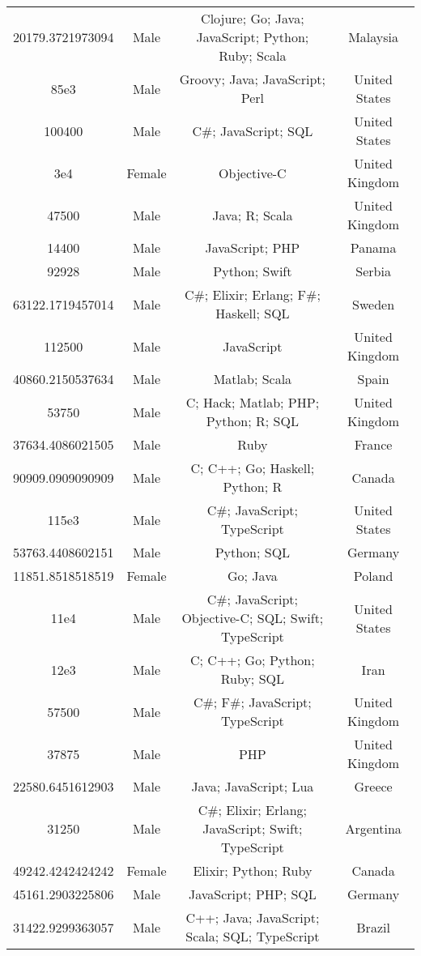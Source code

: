 \begin{center}
\begin{tabular}{ |c|c|c|c| }
20179.3721973094  &  Male  &  Clojure; Go; Java; JavaScript; Python; Ruby; Scala  &  Malaysia  \\ 
85e3  &  Male  &  Groovy; Java; JavaScript; Perl  &  United States  \\ 
100400  &  Male  &  C\#; JavaScript; SQL  &  United States  \\ 
3e4  &  Female  &  Objective-C  &  United Kingdom  \\ 
47500  &  Male  &  Java; R; Scala  &  United Kingdom  \\ 
14400  &  Male  &  JavaScript; PHP  &  Panama  \\ 
92928  &  Male  &  Python; Swift  &  Serbia  \\ 
63122.1719457014  &  Male  &  C\#; Elixir; Erlang; F\#; Haskell; SQL  &  Sweden  \\ 
112500  &  Male  &  JavaScript  &  United Kingdom  \\ 
40860.2150537634  &  Male  &  Matlab; Scala  &  Spain  \\ 
53750  &  Male  &  C; Hack; Matlab; PHP; Python; R; SQL  &  United Kingdom  \\ 
37634.4086021505  &  Male  &  Ruby  &  France  \\ 
90909.0909090909  &  Male  &  C; C++; Go; Haskell; Python; R  &  Canada  \\ 
115e3  &  Male  &  C\#; JavaScript; TypeScript  &  United States  \\ 
53763.4408602151  &  Male  &  Python; SQL  &  Germany  \\ 
11851.8518518519  &  Female  &  Go; Java  &  Poland  \\ 
11e4  &  Male  &  C\#; JavaScript; Objective-C; SQL; Swift; TypeScript  &  United States  \\ 
12e3  &  Male  &  C; C++; Go; Python; Ruby; SQL  &  Iran  \\ 
57500  &  Male  &  C\#; F\#; JavaScript; TypeScript  &  United Kingdom  \\ 
37875  &  Male  &  PHP  &  United Kingdom  \\ 
22580.6451612903  &  Male  &  Java; JavaScript; Lua  &  Greece  \\ 
31250  &  Male  &  C\#; Elixir; Erlang; JavaScript; Swift; TypeScript  &  Argentina  \\ 
49242.4242424242  &  Female  &  Elixir; Python; Ruby  &  Canada  \\ 
45161.2903225806  &  Male  &  JavaScript; PHP; SQL  &  Germany  \\ 
31422.9299363057  &  Male  &  C++; Java; JavaScript; Scala; SQL; TypeScript  &  Brazil  \\ 

\end{tabular}
\end{center}
